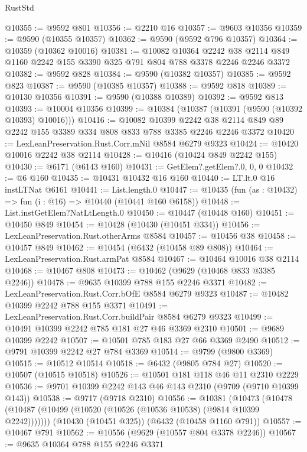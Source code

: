 \begin{lexlean}{RustStd}
\begin{coremodule}
@10355 := @9592 @801
@10356 := @2210 @16
@10357 := @9603 @10356
@10359 := @9590 (@10355 @10357)
@10362 := @9590 (@9592 @796 @10357)
@10364 := @10359 (@10362 @10016)
@10381 := @10082
    @10364
    @2242
    @38
    @2114
    @849
    @1160
    @2242
    @155
    @3390
    @325
    @791
    @804
    @788
    @3378
    @2246
    @2246
    @3372
@10382 := @9592 @828
@10384 := @9590 (@10382 @10357)
@10385 := @9592 @823
@10387 := @9590 (@10385 @10357)
@10388 := @9592 @818
@10389 := @10130 @10356
@10391 := @9590 (@10388 @10389)
@10392 := @9592 @813
@10393 := @10004 @10356
@10399 := @10384 (@10387 (@10391 (@9590 (@10392 @10393) @10016)))
@10416 := @10082
    @10399
    @2242
    @38
    @2114
    @849
    @89
    @2242
    @155
    @3389
    @334
    @808
    @833
    @788
    @3385
    @2246
    @2246
    @3372
@10420 := LexLeanPreservation.Rust.Corr.mNil @8584 @6279 @9323
@10424 := @10420 @10016 @2242 @38 @2114
@10428 := @10416 (@10424 @849 @2242 @155)
@10430 := @6171 (@6143 @160)
@10431 := GetElem?.getElem?.{0, 0, 0}
@10432 := @6 @160
@10435 := @10431 @10432 @16 @160
@10440 := LT.lt.{0} @16 instLTNat @6161
@10441 := List.length.{0}
@10447 := @10435 (fun (as : @10432) => fun (i : @16) => @10440 (@10441 @160 @6158))
@10448 := List.instGetElem?NatLtLength.{0}
@10450 := @10447 (@10448 @160)
@10451 := @10450 @849
@10454 := @10428 (@10430 (@10451 @334))
@10456 := LexLeanPreservation.Rust.otherArms @8584
@10457 := @10456 @38
@10458 := @10457 @849
@10462 := @10454 (@6432 (@10458 @89 @808))
@10464 := LexLeanPreservation.Rust.armPat @8584
@10467 := @10464 @10016 @38 @2114
@10468 := @10467 @808
@10473 := @10462 (@9629 (@10468 @833 @3385 @2246))
@10478 := @9635 @10399 @788 @155 @2246 @3371
@10482 := LexLeanPreservation.Rust.Corr.bOfE @8584 @6279 @9323
@10487 := @10482 @10399 @2242 @788 @155 @3371
@10491 := LexLeanPreservation.Rust.Corr.buildPair @8584 @6279 @9323
@10499 := @10491 @10399 @2242 @785 @181 @27 @46 @3369 @2310
@10501 := @9689 @10399 @2242
@10507 := @10501 @785 @183 @27 @66 @3369 @2490
@10512 := @9791 @10399 @2242 @27 @784 @3369
@10514 := @9799 (@9800 @3369)
@10515 := @10512 @10514
@10518 := @6432 (@9805 @784 @27)
@10520 := @10507 (@10515 @10518)
@10526 := @10501 @181 @118 @46 @11 @2310 @2229
@10536 := @9701 @10399 @2242 @143 @46 @143 @2310 (@9709 (@9710 @10399 @143))
@10538 := @9717 (@9718 @2310)
@10556 := @10381
    (@10473 (@10478 (@10487 (@10499 (@10520 (@10526 (@10536 @10538) (@9814 @10399 @2242)))))))
    (@10430 (@10451 @325))
    (@6432 (@10458 @1160 @791))
@10557 := @10467 @791
@10562 := @10556 (@9629 (@10557 @804 @3378 @2246))
@10567 := @9635 @10364 @788 @155 @2246 @3371

\end{coremodule}
\end{lexlean}
